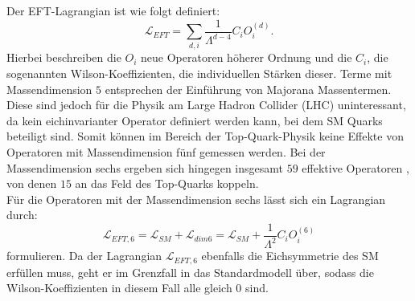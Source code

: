 Der EFT-Lagrangian ist wie folgt definiert:
\begin{equation}
  \mathscr{L}_{EFT} = \sum_{d,i} \frac{1}{\Lambda^{d-4}} C_i O_i^{(d)}.
\end{equation}
Hierbei beschreiben die $O_i$ neue Operatoren höherer Ordnung und die $C_i$, die sogenannten Wilson-Koeffizienten, die individuellen Stärken dieser. Terme mit Massendimension $5$ entsprechen der Einführung von Majorana Massentermen. Diese sind jedoch für die Physik am Large Hadron Collider (LHC) uninteressant, da kein eichinvarianter Operator definiert werden kann, bei dem SM Quarks beteiligt sind. Somit können im Bereich der Top-Quark-Physik keine Effekte von Operatoren mit Massendimension fünf gemessen werden. Bei der Massendimension sechs ergeben sich hingegen insgesamt $59$ effektive Operatoren \cite{Grzadkowski:2010es}, von denen $15$\cite{Zhang:2014rja} an das
Feld des Top-Quarks koppeln.\\
Für die Operatoren mit der Massendimension sechs lässt sich ein Lagrangian durch:
\begin{equation}
  \mathscr{L}_{EFT, 6} = \mathscr{L}_{SM} + \mathscr{L}_{dim6} = \mathscr{L}_{SM} + \frac{1}{\Lambda^{2}} C_i O_i^{(6)}
\end{equation}
formulieren. Da der Lagrangian $\mathscr{L}_{EFT, 6}$ ebenfalls die Eichsymmetrie des SM erfüllen muss, geht er im Grenzfall in das Standardmodell über, sodass die Wilson-Koeffizienten in diesem Fall alle gleich 0 sind.

